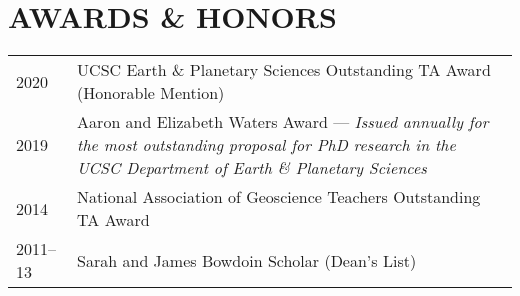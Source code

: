 \section*{AWARDS \& HONORS}

\begin{tabular}{@{}p{.1\linewidth} @{}p{.9\linewidth}} 
	2020 & UCSC Earth \& Planetary Sciences Outstanding TA Award (Honorable Mention) \\
	2019 & Aaron and Elizabeth Waters Award ---  \textit{Issued annually for the most outstanding proposal for PhD research in the UCSC Department of Earth \& Planetary Sciences} \\
	2014 & National Association of Geoscience Teachers Outstanding TA Award \\
	2011--13 & Sarah and James Bowdoin Scholar (Dean's List) \\
\end{tabular}